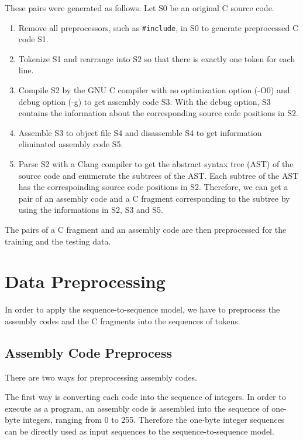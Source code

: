 \documentclass[senior,final,11pt]{iscs-thesis}
\begin{document}
These pairs were generated as follows. Let S0 be an original C source code.
\begin{enumerate}
\item Remove all preprocessors, such as \texttt{\#include}, in S0 to generate preprocessed C code S1. 
\item Tokenize S1 and rearrange into S2 so that there is exactly one token for each line. 
\item 
Compile S2 by the GNU C compiler with no optimization option (-O0) and debug option (-g) to get assembly code S3. 
With the debug option, S3 contains the information about the corresponding source code positions in S2. 
\item Assemble S3 to object file S4 and disassemble S4 to get information eliminated assembly code S5.
\item 
Parse S2 with a Clang compiler to get the abstract syntax tree (AST) of the source code and enumerate the subtrees of the AST.
Each subtree of the AST has the correspoinding source code positions in S2.
Therefore, we can get a pair of an assembly code and a C fragment corresponding to the subtree 
by using the informations in S2, S3 and S5.
\end{enumerate}

The pairs of a C fragment and an assembly code are then preprocessed for the training and the testing data.

\section{Data Preprocessing}

In order to apply the sequence-to-sequence model, 
we have to preprocess the assembly codes and the C fragments into the sequences of tokens.

\subsection{Assembly Code Preprocess}
There are two ways for preprocessing assembly codes.

The first way is converting each code into the sequence of integers. 
In order to execute as a program, an assembly code is assembled into the sequence of one-byte integers, ranging from 0 to 255.
Therefore the one-byte integer sequences can be directly used as input sequences to the sequence-to-sequence model.
\end{document}
